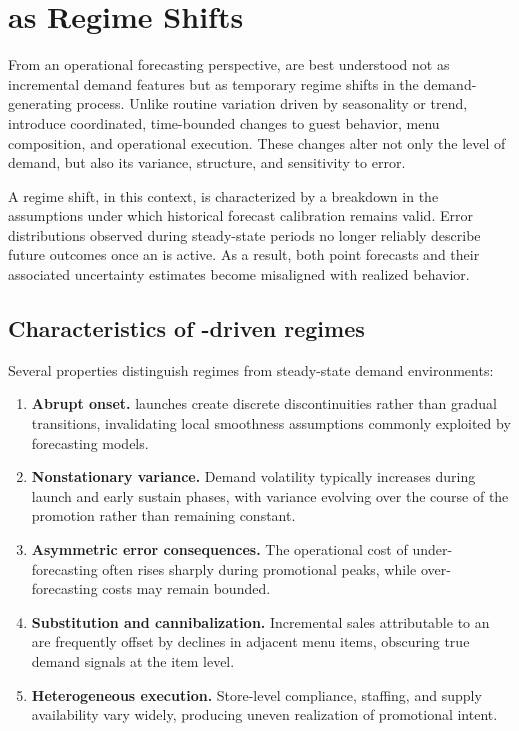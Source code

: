 
\section{\LTOs{} as Regime Shifts}
\label{sec:regime-shifts}

From an operational forecasting perspective, \LTOs{} are best understood not as incremental demand
features but as temporary regime shifts in the demand-generating process. Unlike routine variation
driven by seasonality or trend, \LTOs{} introduce coordinated, time-bounded changes to guest
behavior, menu composition, and operational execution. These changes alter not only the level of
demand, but also its variance, structure, and sensitivity to error.

A regime shift, in this context, is characterized by a breakdown in the assumptions under which
historical forecast calibration remains valid. Error distributions observed during steady-state
periods no longer reliably describe future outcomes once an \LTO{} is active. As a result, both
point forecasts and their associated uncertainty estimates become misaligned with realized
behavior.

\subsection{Characteristics of \LTO{}-driven regimes}
\label{subsec:lto-characteristics}

Several properties distinguish \LTO{} regimes from steady-state demand environments:

\begin{enumerate}[leftmargin=*, itemsep=2pt]
  \item \textbf{Abrupt onset.} \LTO{} launches create discrete discontinuities rather than gradual
  transitions, invalidating local smoothness assumptions commonly exploited by forecasting
  models.

  \item \textbf{Nonstationary variance.} Demand volatility typically increases during launch and
  early sustain phases, with variance evolving over the course of the promotion rather than
  remaining constant.

  \item \textbf{Asymmetric error consequences.} The operational cost of under-forecasting often
  rises sharply during promotional peaks, while over-forecasting costs may remain bounded.

  \item \textbf{Substitution and cannibalization.} Incremental sales attributable to an \LTO{} are
  frequently offset by declines in adjacent menu items, obscuring true demand signals at the
  item level.

  \item \textbf{Heterogeneous execution.} Store-level compliance, staffing, and supply availability
  vary widely, producing uneven realization of promotional intent.
\end{enumerate}

